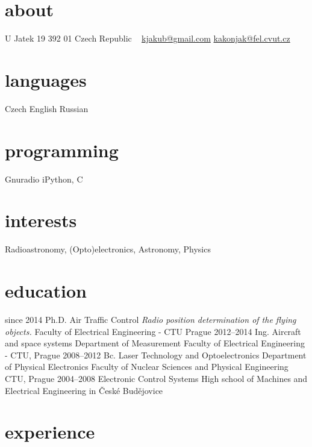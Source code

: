 \documentclass[]{friggeri-cv}
\begin{document}
       {}


\begin{aside}
  \section{about}
    U Jatek 19
    392 01
    Czech Republic
    ~
    \href{mailto:kjakub@gmail.com}{kjakub@gmail.com}
    \href{mailto:kakonjak@fel.cvut.cz}{kakonjak@fel.cvut.cz}
  \section{languages}
    Czech
    English
    Russian
  \section{programming}
    Gnuradio
    iPython, C
\end{aside}

\section{interests}

Radioastronomy, (Opto)electronics, Astronomy, Physics 

\section{education}

\begin{entrylist}
  \entry
    {since 2014}
    {Ph.D. {\normalfont Air Traffic Control}}
    {\emph{Radio position determination of the flying objects.}}
    { Faculty of Electrical Engineering - CTU Prague}
  \entry
    {2012–2014}
    {Ing. Aircraft and space systems}
    {Department of Measurement}
    { Faculty of Electrical Engineering - CTU, Prague}
  \entry
    {2008–2012}
    {Bc. Laser Technology and Optoelectronics}
    {Department of Physical Electronics}
    {Faculty of Nuclear Sciences and Physical Engineering CTU, Prague}
  \entry
    {2004–2008}
    {Electronic Control Systems}
    {}
    {High school of Machines and Electrical Engineering in České Budějovice}
\end{entrylist}

\section{experience}
\end{document}
